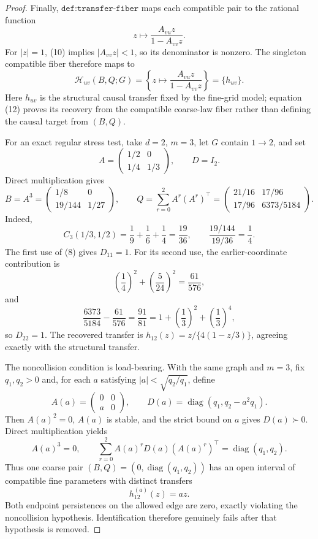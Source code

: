 \documentclass{article}
\begin{document}
\begin{proof}
Finally, \(\texttt{def:transfer-fiber}\) maps each compatible pair to the rational function
\[
z\longmapsto \frac{A_{vu}z}{1-A_{vv}z}.
\]
For \(|z|=1\), (10) implies \(|A_{vv}z|<1\), so its denominator is nonzero.  The singleton compatible fiber therefore maps to
\[
\mathcal H_{uv}(B,Q;G)
=\left\{z\longmapsto\frac{A_{vu}z}{1-A_{vv}z}\right\}
=\{h_{uv}\}. \tag{12}
\]
Here \(h_{uv}\) is the structural causal transfer fixed by the fine-grid model; equation (12) proves its recovery from the compatible coarse-law fiber rather than defining the causal target from \((B,Q)\).

For an exact regular stress test, take \(d=2\), \(m=3\), let \(G\) contain \(1\to2\), and set
\[
A=\begin{pmatrix}1/2&0\\[2pt]1/4&1/3\end{pmatrix},
\qquad D=I_2.
\]
Direct multiplication gives
\[
B=A^3
=\begin{pmatrix}1/8&0\\[2pt]19/144&1/27\end{pmatrix},
\qquad
Q=\sum_{r=0}^{2}A^r(A^r)^\top
=\begin{pmatrix}21/16&17/96\\[2pt]17/96&6373/5184\end{pmatrix}.
\]
Indeed,
\[
C_3(1/3,1/2)=\frac19+\frac16+\frac14=\frac{19}{36},
\qquad
\frac{19/144}{19/36}=\frac14.
\]
The first use of (8) gives \(D_{11}=1\).  For its second use, the earlier-coordinate contribution is
\[
\left(\frac14\right)^2+\left(\frac5{24}\right)^2=\frac{61}{576},
\]
and
\[
\frac{6373}{5184}-\frac{61}{576}
=\frac{91}{81}
=1+\left(\frac13\right)^2+\left(\frac13\right)^4,
\]
so \(D_{22}=1\).  The recovered transfer is \(h_{12}(z)=z/\{4(1-z/3)\}\), agreeing exactly with the structural transfer.

The noncollision condition is load-bearing.  With the same graph and \(m=3\), fix \(q_1,q_2>0\) and, for each \(a\) satisfying \(|a|<\sqrt{q_2/q_1}\), define
\[
A(a)=\begin{pmatrix}0&0\\ a&0\end{pmatrix},
\qquad
D(a)=\operatorname{diag}(q_1,q_2-a^2q_1).
\]
Then \(A(a)^2=0\), \(A(a)\) is stable, and the strict bound on \(a\) gives \(D(a)\succ0\).  Direct multiplication yields
\[
A(a)^3=0,
\qquad
\sum_{r=0}^{2}A(a)^rD(a)(A(a)^r)^\top
=\operatorname{diag}(q_1,q_2).
\]
Thus one coarse pair \((B,Q)=(0,\operatorname{diag}(q_1,q_2))\) has an open interval of compatible fine parameters with distinct transfers
\[
h_{12}^{(a)}(z)=az.
\]
Both endpoint persistences on the allowed edge are zero, exactly violating the noncollision hypothesis.  Identification therefore genuinely fails after that hypothesis is removed.
\end{proof}
\end{document}
